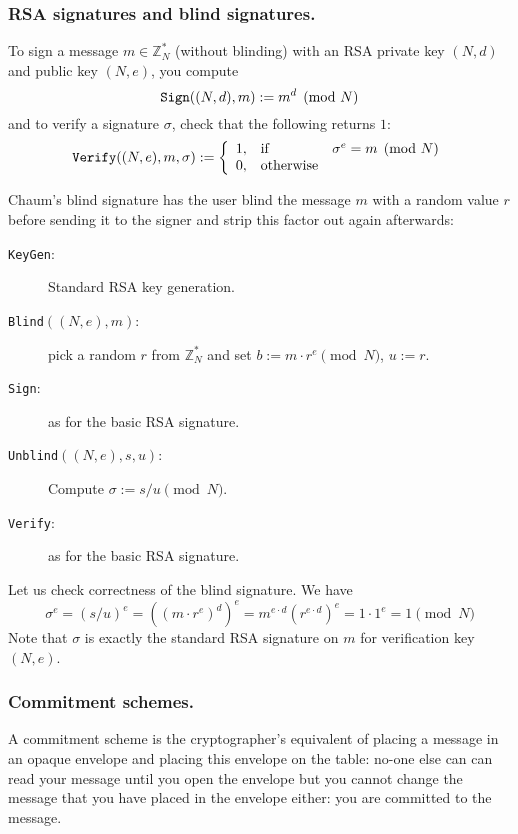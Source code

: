 \documentclass{llncs}
\newcommand{\alg}[1]{\textup{\texttt{#1}}}
\begin{document}
\subsubsection{RSA signatures and blind signatures.}
To sign a message $m \in \mathbb Z^*_N$ (without blinding) with an RSA private
key $(N, d)$ and public key $(N, e)$, you compute
\[
\alg{Sign}((N, d), m) := m^d \pmod{N}
\]
and to verify a signature $\sigma$, check that the following returns $1$:
\[
\alg{Verify}((N, e), m, \sigma) :=
\left\{ \begin{array}{lll}
1, & \textrm{if} & \sigma^e = m \pmod{N} \\
0, & \textrm{otherwise} & \\
\end{array} \right.
\]

Chaum's blind signature has the user blind the message $m$ with a random value
$r$ before sending it to the signer and strip this factor out again afterwards:

\begin{description}
\item[\alg{KeyGen}:] Standard RSA key generation.
\item[\alg{Blind}$((N, e), m)$:] pick a random $r$ from $\mathbb Z^*_N$ and set
$b := m \cdot r^e \pmod{N}$, $u := r$.
\item[\alg{Sign}:] as for the basic RSA signature.
\item[\alg{Unblind}$((N, e), s, u)$:] Compute $\sigma := s/u \pmod{N}$.
\item[\alg{Verify}:] as for the basic RSA signature.
\end{description}

Let us check correctness of the blind signature. We have
\[
\sigma^e = (s/u)^e = ((m \cdot r^e)^d)^e = m^{e \cdot d} (r^{e \cdot d})^e =
1 \cdot 1^e = 1 \pmod{N}
\]
Note that $\sigma$ is exactly the standard RSA signature on $m$ for verification
key $(N, e)$.

\subsubsection{Commitment schemes.}
A commitment scheme is the cryptographer's equivalent of placing a message in an
opaque envelope and placing this envelope on the table: no-one else can can read
your message until you open the envelope but you cannot change the message that
you have placed in the envelope either: you are committed to the message.
\end{document}
